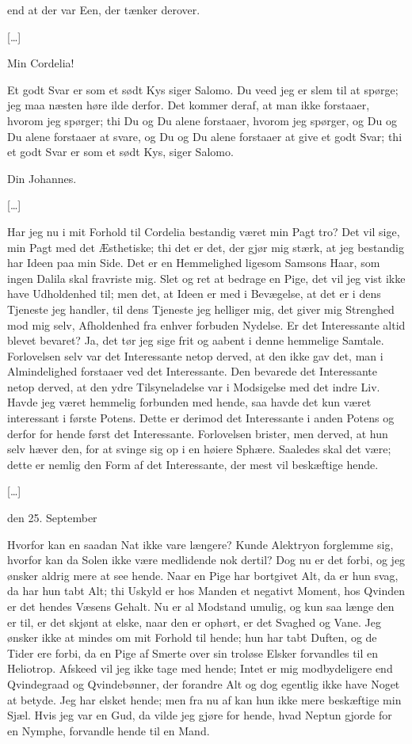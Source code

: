 \documentclass[12pt,a4paper]{article}
\begin{document}
end at der var Een, der tænker derover.

[…]

Min Cordelia!

Et godt Svar er som et sødt Kys siger Salomo. Du veed jeg er slem til at spørge; jeg maa næsten høre ilde derfor. Det kommer deraf, at man ikke forstaaer, hvorom jeg spørger; thi Du og Du alene forstaaer, hvorom jeg spørger, og Du og Du alene forstaaer at svare, og Du og Du alene forstaaer at give et godt Svar; thi et godt Svar er som et sødt Kys, siger Salomo.

Din Johannes.

[…]

Har jeg nu i mit Forhold til Cordelia bestandig været min Pagt tro? Det vil sige, min Pagt med det Æsthetiske; thi det er det, der gjør mig stærk, at jeg bestandig har Ideen paa min Side. Det er en Hemmelighed ligesom Samsons Haar, som ingen Dalila skal fravriste mig. Slet og ret at bedrage en Pige, det vil jeg vist ikke have Udholdenhed til; men det, at Ideen er med i Bevægelse, at det er i dens Tjeneste jeg handler, til dens Tjeneste jeg helliger mig, det giver mig Strenghed mod mig selv, Afholdenhed fra enhver forbuden Nydelse. Er det Interessante altid blevet bevaret? Ja, det tør jeg sige frit og aabent i denne hemmelige Samtale. Forlovelsen selv var det Interessante netop derved, at den ikke gav det, man i Almindelighed forstaaer ved det Interessante. Den bevarede det Interessante netop derved, at den ydre Tilsyneladelse var i Modsigelse med det indre Liv. Havde jeg været hemmelig forbunden med hende, saa havde det kun været interessant i første Potens. Dette er derimod det Interessante i anden Potens og derfor for hende først det Interessante. Forlovelsen brister, men derved, at hun selv hæver den, for at svinge sig op i en høiere Sphære. Saaledes skal det være; dette er nemlig den Form af det Interessante, der mest vil beskæftige hende.

[…]

den 25. September

Hvorfor kan en saadan Nat ikke vare længere? Kunde Alektryon forglemme sig, hvorfor kan da Solen ikke være medlidende nok dertil? Dog nu er det forbi, og jeg ønsker aldrig mere at see hende. Naar en Pige har bortgivet Alt, da er hun svag, da har hun tabt Alt; thi Uskyld er hos Manden et negativt Moment, hos Qvinden er det hendes Væsens Gehalt. Nu er al Modstand umulig, og kun saa længe den er til, er det skjønt at elske, naar den er ophørt, er det Svaghed og Vane. Jeg ønsker ikke at mindes om mit Forhold til hende; hun har tabt Duften, og de Tider ere forbi, da en Pige af Smerte over sin troløse Elsker forvandles til en Heliotrop. Afskeed vil jeg ikke tage med hende; Intet er mig modbydeligere end Qvindegraad og Qvindebønner, der forandre Alt og dog egentlig ikke have Noget at betyde. Jeg har elsket hende; men fra nu af kan hun ikke mere beskæftige min Sjæl. Hvis jeg var en Gud, da vilde jeg gjøre for hende, hvad Neptun gjorde for en Nymphe, forvandle hende til en Mand.
\end{document}
